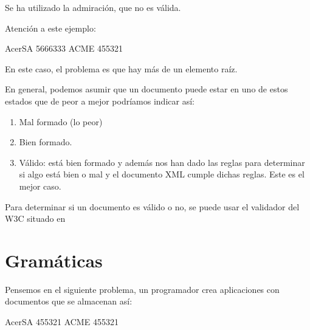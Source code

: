 \documentclass[letterpaper,10pt,spanish]{sphinxmanual}
\begin{document}
Se ha utilizado la admiración, que no es válida.

Atención a este ejemplo:

\begin{sphinxVerbatim}[commandchars=\\\{\}]
        AcerSA
        5666333
        ACME
        455321
\end{sphinxVerbatim}

En este caso, el problema es que hay más de un elemento raíz.

En general, podemos asumir que un documento puede estar en uno de estos estados que de peor a mejor podríamos indicar así:
\begin{enumerate}
\item {} 
Mal formado (lo peor)

\item {} 
Bien formado.

\item {} 
Válido: está bien formado y además nos han dado las reglas para determinar si algo está bien o mal y el documento XML cumple dichas reglas. Este es el mejor caso.

\end{enumerate}

Para determinar si un documento es válido o no, se puede usar el validador del W3C situado en 


\section{Gramáticas}
\label{\detokenize{tema5:gramaticas}}
Pensemos en el siguiente problema, un programador crea aplicaciones con documentos que se almacenan así:

\begin{sphinxVerbatim}[commandchars=\\\{\}]
                AcerSA
                455321
                ACME
                455321
\end{sphinxVerbatim}
\end{document}
